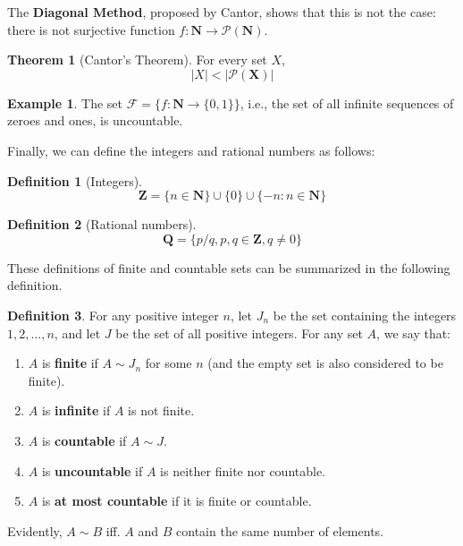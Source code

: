 \documentclass[tikz,12pt,a4paper]{article}
\theoremstyle{definition}
\newtheorem{theorem}{Theorem}[section]
\newtheorem{example}{Example}[section]
\newtheorem{definition}{Definition}[section]
\begin{document}
The \textbf{Diagonal Method}, proposed by Cantor, shows that this is not the case: there is not surjective function $f : \textbf{N} \longrightarrow \mathcal{P}(\textbf{N})$.

\begin{theorem}[Cantor's Theorem]
	For every set $X$, \[ | X | < | \mathcal{P}(\textbf{X}) | \]
\end{theorem}

\begin{example}
	The set $\mathcal{F} = \{ f: \textbf{N} \longrightarrow \{0, 1 \} \}$, i.e., the set of all infinite sequences of zeroes and ones, is uncountable.
\end{example}

Finally, we can define the integers and rational numbers as follows:

\begin{definition}[Integers]
	\[
		\textbf{Z} = \{ n \in \textbf{N} \} \cup \{ 0 \} \cup \{ -n : n \in \textbf{N} \}	
	\]
\end{definition}

\begin{definition}[Rational numbers]
	\[
		\textbf{Q} = \{ p/q, p,q \in \textbf{Z}, q \neq 0 \}
	\]
\end{definition}

These definitions of finite and countable sets can be summarized in the following definition.

\begin{definition}
	For any positive integer $n$, let $J_n$ be the set containing the integers $1, 2, \ldots, n$, and let $J$ be the set of all positive integers. For any set $A$, we say that:
	\begin{enumerate}
		\item $A$ is \textbf{finite} if $A \sim J_n$ for some $n$ (and the empty set is also considered to be finite).
		\item $A$ is \textbf{infinite} if $A$ is not finite.
		\item $A$ is \textbf{countable} if $A \sim J$.
		\item $A$ is \textbf{uncountable} if $A$ is neither finite nor countable.
		\item $A$ is \textbf{at most countable} if it is finite or countable.
	\end{enumerate}
\end{definition}

Evidently, $A \sim B$ iff. $A$ and $B$ contain the same number of elements.
\end{document}
